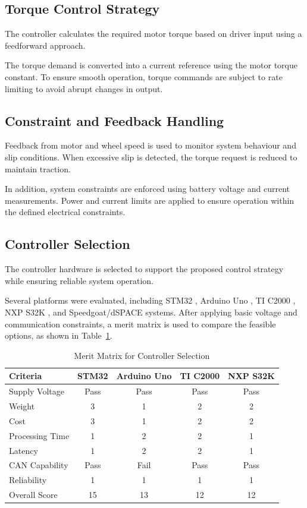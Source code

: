 \subsection{Torque Control Strategy}

The controller calculates the required motor torque based on driver input using a feedforward approach.

The torque demand is converted into a current reference using the motor torque constant. To ensure smooth operation, torque commands are subject to rate limiting to avoid abrupt changes in output.

\subsection{Constraint and Feedback Handling}

Feedback from motor and wheel speed is used to monitor system behaviour and slip conditions. When excessive slip is detected, the torque request is reduced to maintain traction.

In addition, system constraints are enforced using battery voltage and current measurements. Power and current limits are applied to ensure operation within the defined electrical constraints.

\subsection{Controller Selection}

The controller hardware is selected to support the proposed control strategy while ensuring reliable system operation.

Several platforms were evaluated, including STM32\cite{stm32-nucleo-f4}
, Arduino Uno\cite{Arduino_uno_data_sheet}
, TI C2000\cite{TI_C200_data_sheet}
, NXP S32K\cite{NPX_S32K_data_sheet}
, and Speedgoat/dSPACE systems\cite{Speedgoat_data_sheet}.
After applying basic voltage and communication constraints, a merit matrix is used to compare the feasible options, as shown in Table~\ref{tab:controller_selection}.

\begin{table}[H]
\centering
\caption{Merit Matrix for Controller Selection}
\label{tab:controller_selection}
\begin{tabular}{lcccc}
\toprule
Criteria & STM32 & Arduino Uno & TI C2000 & NXP S32K \\
\midrule
Supply Voltage & Pass & Pass & Pass & Pass \\
Weight & 3 & 1 & 2 & 2 \\
Cost & 3 & 1 & 2 & 2 \\
Processing Time & 1 & 2 & 2 & 1 \\
Latency & 1 & 2 & 2 & 1 \\
CAN Capability & Pass & Fail & Pass & Pass \\
Reliability & 1 & 1 & 1 & 1 \\
\midrule
Overall Score & 15 & 13 & 12 & 12 \\
\bottomrule
\end{tabular}
\end{table}


